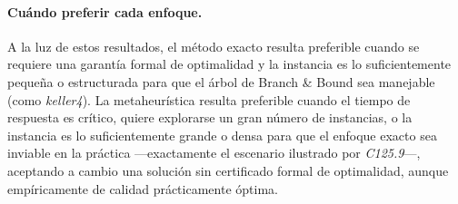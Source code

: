 \paragraph{Cuándo preferir cada enfoque.} A la luz de estos resultados, el método exacto resulta preferible cuando se requiere una garantía formal de optimalidad y la instancia es lo suficientemente pequeña o estructurada para que el árbol de Branch \& Bound sea manejable (como \textit{keller4}). La metaheurística resulta preferible cuando el tiempo de respuesta es crítico, quiere explorarse un gran número de instancias, o la instancia es lo suficientemente grande o densa para que el enfoque exacto sea inviable en la práctica —exactamente el escenario ilustrado por \textit{C125.9}—, aceptando a cambio una solución sin certificado formal de optimalidad, aunque empíricamente de calidad prácticamente óptima.
